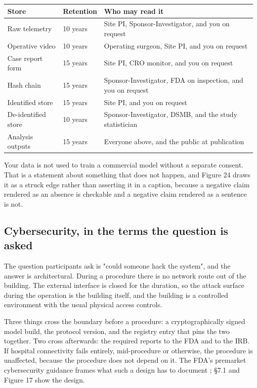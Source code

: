 \vspace{0.30em}

\noindent\begin{tabularx}{\textwidth}{L{3.5cm} C{1.7cm} Y}
\toprule
\textbf{Store} & \textbf{Retention} & \textbf{Who may read it} \\
\midrule
Raw telemetry & 10 years & Site PI, Sponsor-Investigator, and you on request \\
Operative video & 10 years & Operating surgeon, Site PI, and you on request \\
Case report form & 15 years & Site PI, CRO monitor, and you on request \\
Hash chain & 15 years & Sponsor-Investigator, FDA on inspection, and you on request \\
Identified store & 15 years & Site PI, and you on request \\
De-identified store & 10 years & Sponsor-Investigator, DSMB, and the study statistician \\
Analysis outputs & 15 years & Everyone above, and the public at publication \\
\bottomrule
\end{tabularx}

\vspace{0.30em}

\noindent Your data is not used to train a commercial model without a separate
consent. That is a statement about something that does not happen, and Figure 24
draws it as a struck edge rather than asserting it in a caption, because a
negative claim rendered as an absence is checkable and a negative claim rendered
as a sentence is not.

\subsection{Cybersecurity, in the terms the question is asked}

The question participants ask is "could someone hack the system", and the answer
is architectural. During a procedure there is no network route out of the
building. The external interface is closed for the duration, so the attack
surface during the operation is the building itself, and the building is a
controlled environment with the usual physical access controls.

Three things cross the boundary before a procedure: a cryptographically signed
model build, the protocol version, and the registry entry that pins the two
together. Two cross afterwards: the required reports to the FDA and to the IRB.
If hospital connectivity fails entirely, mid-procedure or otherwise, the
procedure is unaffected, because the procedure does not depend on it. The FDA's
premarket cybersecurity guidance frames what such a design has to document
\cite{FDACyber2026}; \S 7.1 and Figure 17 show the design.

